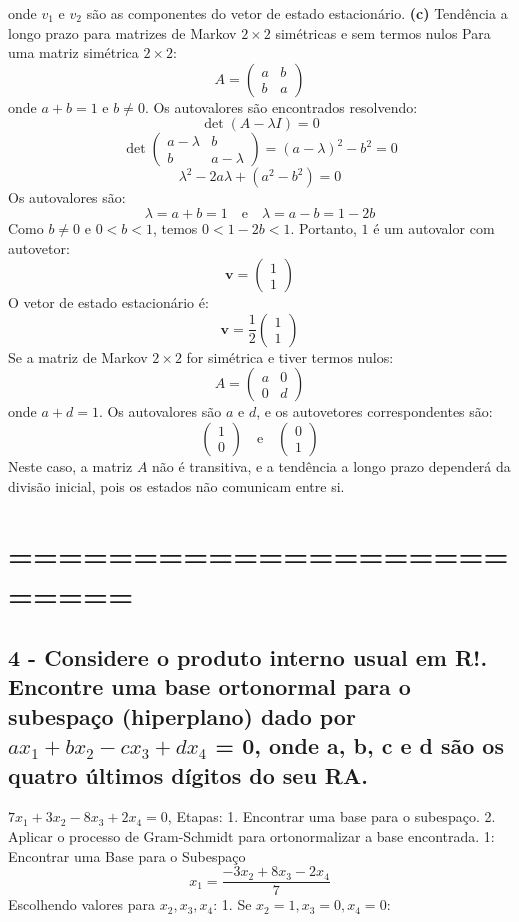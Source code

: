 {{{onde \(v_1\) e \(v_2\) são as componentes do vetor de estado estacionário.
\textbf{(c)} Tendência a longo prazo para matrizes de Markov \(2 \times 2\) simétricas e sem termos nulos
Para uma matriz simétrica \(2 \times 2\):
\[ A = \begin{pmatrix} a & b \\ b & a \end{pmatrix} \]
onde \(a + b = 1\) e \(b \neq 0\).
Os autovalores são encontrados resolvendo:
\[ \det(A - \lambda I) = 0 \]
\[ \det \begin{pmatrix} a - \lambda & b \\ b & a - \lambda \end{pmatrix} = (a - \lambda)^2 - b^2 = 0 \]
\[ \lambda^2 - 2a\lambda + (a^2 - b^2) = 0 \]
Os autovalores são:
\[ \lambda = a + b = 1 \quad \text{e} \quad \lambda = a - b = 1 - 2b \]
Como \(b \neq 0\) e \(0 < b < 1\), temos \(0 < 1 - 2b < 1\).
Portanto, \(1\) é um autovalor com
 autovetor:
\[ \mathbf{v} = \begin{pmatrix} 1 \\ 1 \end{pmatrix} \]
O vetor de estado estacionário é:
\[ \mathbf{v} = \frac{1}{2} \begin{pmatrix} 1 \\ 1 \end{pmatrix} \]
Se a matriz de Markov \(2 \times 2\) for simétrica e tiver termos nulos:
\[ A = \begin{pmatrix} a & 0 \\ 0 & d \end{pmatrix} \]
onde \(a + d = 1\).
Os autovalores são \(a\) e \(d\), e os autovetores correspondentes são:
\[ \begin{pmatrix} 1 \\ 0 \end{pmatrix} \quad \text{e} \quad \begin{pmatrix} 0 \\ 1 \end{pmatrix} \]
Neste caso, a matriz \(A\) não é transitiva, e a tendência a longo prazo dependerá da divisão inicial, pois os estados não comunicam entre si.
\section{=========================}
\subsection{4 - Considere o produto interno usual em R!. Encontre uma base ortonormal para o subespaço
(hiperplano) dado por \(ax_1+ bx_2 - cx_3 + dx_4\) = 0, onde a, b, c e d são os quatro últimos dígitos
do seu RA.}
\(7x_1 + 3x_2 - 8x_3 + 2x_4 = 0\), 
Etapas:
1. Encontrar uma base para o subespaço.
2. Aplicar o processo de Gram-Schmidt para ortonormalizar a base encontrada.
1: Encontrar uma Base para o Subespaço
\[
x_1 = \frac{-3x_2 + 8x_3 - 2x_4}{7}
\]
Escolhendo valores para \(x_2, x_3, x_4\):
1. Se \(x_2 = 1, x_3 = 0, x_4 = 0\):

}}}
